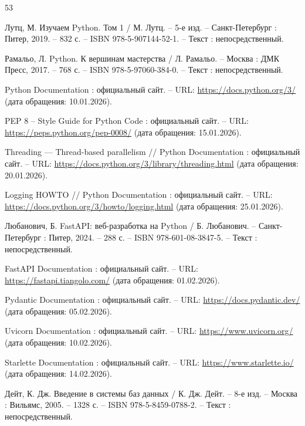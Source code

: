 
\begin{thebibliography}{53}
	
	Лутц, М. Изучаем Python. Том 1 / М. Лутц. – 5-е изд. – Санкт-Петербург : Питер, 2019. – 832 с. – ISBN 978-5-907144-52-1. – Текст : непосредственный.
	
	Рамальо, Л. Python. К вершинам мастерства / Л. Рамальо. – Москва : ДМК Пресс, 2017. – 768 с. – ISBN 978-5-97060-384-0. – Текст : непосредственный.
	
	Python Documentation : официальный сайт. – URL: \url{https://docs.python.org/3/} (дата обращения: 10.01.2026).
	
	PEP 8 – Style Guide for Python Code : официальный сайт. – URL: \url{https://peps.python.org/pep-0008/} (дата обращения: 15.01.2026).
	
	Threading --- Thread-based parallelism // Python Documentation : официальный сайт. – URL: \url{https://docs.python.org/3/library/threading.html} (дата обращения: 20.01.2026).
	
	Logging HOWTO // Python Documentation : официальный сайт. – URL: \url{https://docs.python.org/3/howto/logging.html} (дата обращения: 25.01.2026).
	
	Любанович, Б. FastAPI: веб-разработка на Python / Б. Любанович. – Санкт-Петербург : Питер, 2024. – 288 с. – ISBN 
	978-601-08-3847-5. – Текст : непосредственный.
	
	FastAPI Documentation : официальный сайт. – URL: \url{https://fastapi.tiangolo.com/} (дата обращения: 01.02.2026).
	
	Pydantic Documentation : официальный сайт. – URL: \url{https://docs.pydantic.dev/} (дата обращения: 05.02.2026).
	
	Uvicorn Documentation : официальный сайт. – URL: \url{https://www.uvicorn.org/} (дата обращения: 10.02.2026).
	
	Starlette Documentation : официальный сайт. – URL: \url{https://www.starlette.io/} (дата обращения: 14.02.2026).
	
	Дейт, К. Дж. Введение в системы баз данных / К. Дж. Дейт. – 8-е изд. – Москва : Вильямс, 2005. – 1328 с. – ISBN 978-5-8459-0788-2. – Текст : непосредственный.
	

\end{thebibliography}
